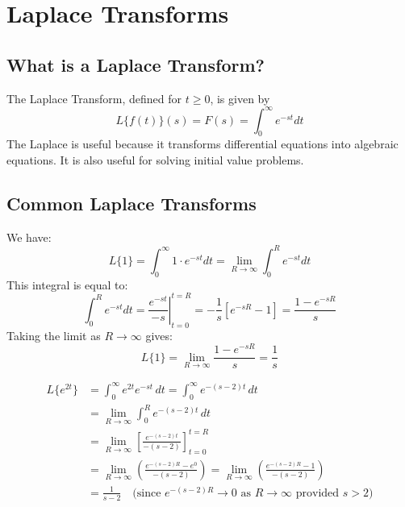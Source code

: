 \documentclass[a4paper, 10pt]{article}
\begin{document}
\section{Laplace Transforms}
\subsection{What is a Laplace Transform?}
The Laplace Transform, defined for $t \geq 0$, is given by
$$L\{f(t)\}(s) = F(s) = \int_0^\infty e^{-st} dt$$
The Laplace is useful because it transforms differential equations into algebraic equations. It is also useful for solving initial value problems.

\subsection{Common Laplace Transforms}

\begin{examplebox}[Find the Laplace Transform of \boldmath$f(t) = 1$]
  We have:
  $$L\{1\} = \int_0^\infty 1 \cdot e^{-st } dt = \lim_{R \to \infty} \int_0^R e^{-st} dt$$
  This integral is equal to:
  $$\int_0^R e^{-st} dt = \left . \frac{e^{-st}}{-s}\right |_{t=0}^{t=R}
    = -\frac{1}{s}[e^{-sR} - 1] = \frac{1 - e^{-sR}}{s}$$
  Taking the limit as $R \to \infty$ gives:
  $$L\{1\} = \lim_{R \to \infty} \frac{1 - e^{-sR}}{s} = \frac{1}{s}$$
\end{examplebox}

\begin{examplebox}[ Find the Laplace Transform of $f(t) = e^{2t}$]
  \begin{align*}
    L\{e^{2t}\}
     & = \int_0^\infty e^{2t}e^{-st}\, dt
    = \int_0^\infty e^{-(s-2)t}\, dt                                                                               \\[1mm]
     & = \lim_{R\to\infty} \int_0^R e^{-(s-2)t}\, dt                                                               \\[1mm]
     & = \lim_{R\to\infty} \left[ \frac{e^{-(s-2)t}}{-(s-2)} \right]_{t=0}^{t=R}                                   \\[1mm]
     & = \lim_{R\to\infty} \left( \frac{e^{-(s-2)R} - e^0}{-(s-2)} \right)
    = \lim_{R\to\infty} \left( \frac{e^{-(s-2)R} - 1}{-(s-2)} \right)                                              \\[1mm]
     & = \frac{1}{s-2} \quad \text{(since } e^{-(s-2)R} \to 0 \text{ as } R\to\infty \text{ provided } s>2\text{)}
  \end{align*}
\end{examplebox}
\end{document}
